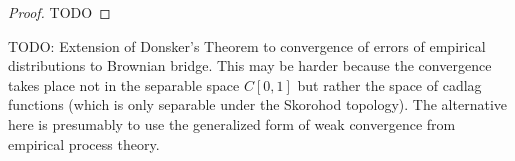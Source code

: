 \begin{proof}
TODO
\end{proof}

TODO: Extension of Donsker's Theorem to convergence of errors of
empirical distributions to Brownian bridge.  This may be harder
because the convergence takes place not in the separable space
$C[0,1]$ but rather the space of cadlag functions (which is only
separable under the Skorohod topology).  The alternative here is
presumably to use the generalized form of weak convergence from
empirical process theory.